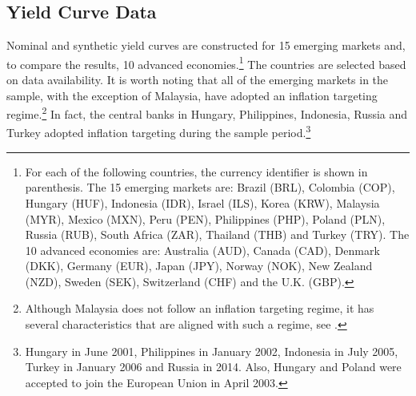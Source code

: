 {\subsection{Yield Curve Data}
\iftoggle{toclinks}{\gototoc}{} %

Nominal and synthetic yield curves are constructed for 15 emerging markets and, to compare the results, 10 advanced economies.\footnote{ For each of the following countries, the currency identifier is shown in parenthesis. The 15 emerging markets are: Brazil (BRL), Colombia (COP), Hungary (HUF), Indonesia (IDR), Israel (ILS), Korea (KRW), Malaysia (MYR), Mexico (MXN), Peru (PEN), Philippines (PHP), Poland (PLN), Russia (RUB), South Africa (ZAR), Thailand (THB) and Turkey (TRY). The 10 advanced economies are: Australia (AUD), Canada (CAD), Denmark (DKK), Germany (EUR), Japan (JPY), Norway (NOK), New Zealand (NZD), Sweden (SEK), Switzerland (CHF) and the U.K. (GBP).} 
The countries are selected based on data availability. 
It is worth noting that all of the emerging markets in the sample, with the exception of Malaysia, have adopted an inflation targeting regime.\footnote{ Although Malaysia does not follow an inflation targeting regime, it has several characteristics that are aligned with such a regime, see \cite*{PenningsRamayandiTang:2015}.}
In fact, the central banks in Hungary, Philippines, Indonesia, Russia and Turkey adopted inflation targeting during the sample period.\footnote{ Hungary in June 2001, Philippines in January 2002, Indonesia in July 2005, Turkey in January 2006 and Russia in 2014. Also, Hungary and Poland were accepted to join the European Union in April 2003.}

}
